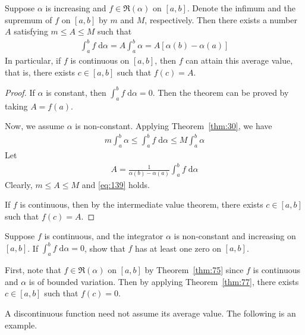 \documentclass[thmcnt=section, 12pt]{my-elegantbook}
\begin{document}
\begin{theorem} \label{thm:77}
	Suppose $ \alpha $ is increasing
	and $f \in \mathfrak{R}(\alpha)$ on $[a, b]$.
	Denote the infimum and the supremum of $f$ on $[a, b]$
	by $m$ and $M$, respectively.
	Then there exists a number $A$ satisfying 
	$m \leq A \leq M$ such that 
	\begin{align}
		\int_a^b f \; \mathrm{d} \alpha
		= A \int_a^b \alpha
		= A [ \alpha(b) - \alpha(a) ]
		\label{eq:139}
	\end{align}
	In particular, if $f$ is continuous on $[a, b]$, 
	then $f$ can attain this average value, that is, 
	there exists $c \in [a, b]$ such that $f(c) = A$.
\end{theorem}

\begin{proof}
	If $\alpha$ is constant, then $\int_a^b f \; \mathrm{d} \alpha = 0$.
	Then the theorem can be proved by taking $A = f(a)$.

	Now, we assume $\alpha$ is non-constant. 
	Applying Theorem~\ref{thm:30}, we have 
	\begin{align*}
		m \int_a^b \alpha
		\leq \int_a^b f \; \mathrm{d} \alpha
		\leq M \int_a^b \alpha
	\end{align*}
	Let
	\begin{align*}
		A = \frac{1}{ \alpha(b) - \alpha(a) }
		\int_a^b f \; \mathrm{d} \alpha
	\end{align*}
	Clearly, $m \leq A \leq M$ and \eqref{eq:139} holds.
	
	If $f$ is continuous, then by the intermediate value theorem,
	there exists $c \in [a, b]$ such that $f(c) = A$.
\end{proof}

\begin{exercise} \label{ex:9}
	Suppose $f$ is continuous, 
	and the integrator $\alpha$ is non-constant
	and increasing on $[a, b]$.
	If $\int_a^b f \; \mathrm{d} \alpha = 0$, 
	show that $f$ has at least one zero on $[a, b]$.
\end{exercise}

\begin{solution}
	First, note that $f \in \mathfrak{R}(\alpha)$ on $[a, b]$
	by Theorem~\ref{thm:75} since $f$ is continuous
	and $\alpha$ is of bounded variation.
	Then by applying Theorem~\ref{thm:77},
	there exists $c \in [a, b]$ such that 
	$f(c) = 0$.
\end{solution}

A discontinuous function need not assume its average value.
The following is an example.
\end{document}
